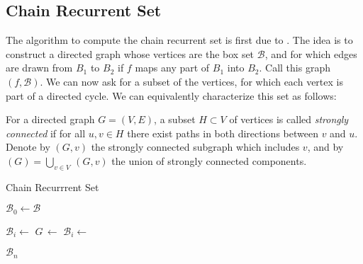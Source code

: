 
\subsection{Chain Recurrent Set}

The algorithm to compute the chain recurrent set is first due to \cite*{chain}. The idea 
is to construct a directed graph whose vertices are the box set $\mathcal{B}$, and for 
which edges are drawn from $B_1$ to $B_2$ if $f$ maps any part of $B_1$ into $B_2$. 
Call this graph $(f, \mathcal{B})$. We can now ask for a subset of the 
vertices, for which each vertex is part of a directed cycle. We can equivalently 
characterize this set as follows:

\begin{definition}
    \cite*{dynbook} For a directed graph $G = (V, E)$, a subset $H \subset V$ of vertices 
    is called \emph{strongly connected} if for all $u, v \in H$ there exist paths in both 
    directions between $v$ and $u$. Denote by $(G, v)$ the strongly connected
    subgraph which includes $v$, and by 
    $(G) = \bigcup_{v \in V}\,$$(G, v)$ 
    the union of strongly connected components.
\end{definition}

\begin{algorithm}
    \caption{Chain Recurrrent Set}
    \label{alg:chain}

    \begin{algorithmic}[1]
        \State $\mathcal{B}_0 \gets \mathcal{B}$

            \State $\mathcal{B}_i \gets$ 
            \State $G\, \gets$ 
            \State $\mathcal{B}_i \gets$ 
        \EndFor

        \State \Return $\mathcal{B}_n$
    \end{algorithmic}
\end{algorithm}

